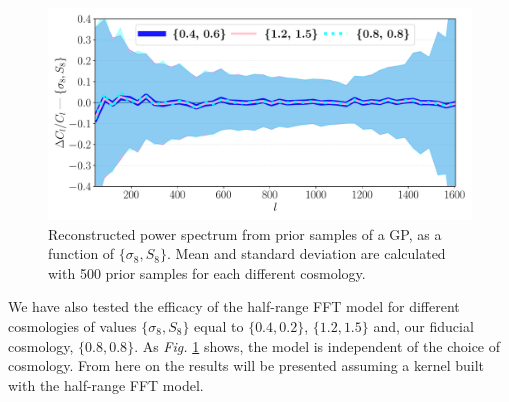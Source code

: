 \begin{figure}[h]
    \centering
    \includegraphics[width=\textwidth]{images/3_cosmology_comparison.pdf}
    \caption{\label{fig:check cosmology} Reconstructed power spectrum from prior samples of a GP, as a function of $\{\sigma_8, S_8\}$. Mean and standard deviation are calculated with 500 prior samples for each different cosmology.}
\end{figure}

We have also tested the efficacy of the half-range FFT model for different cosmologies of values $\{\sigma_8, S_8\}$ equal to $\{0.4,0.2\}$, $\{1.2,1.5\}$ and, our fiducial cosmology, $\{0.8,0.8\}$. As \textit{Fig. }\ref{fig:check cosmology} shows, the model is independent of the choice of cosmology. From here on the results will be presented assuming a kernel built with the half-range FFT model.

